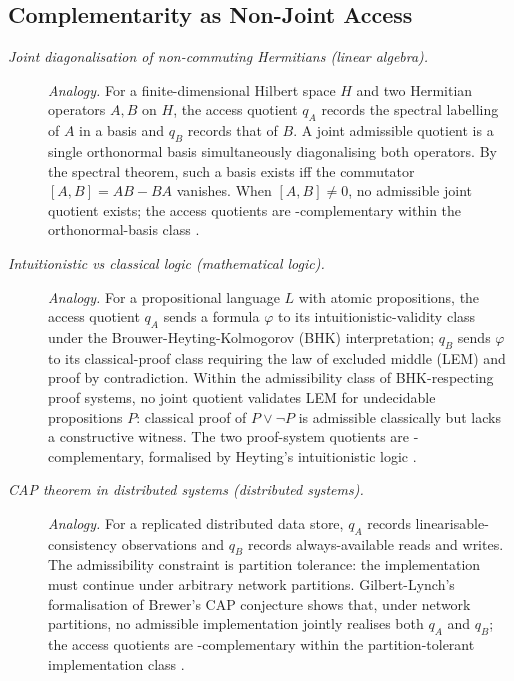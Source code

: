 \subsection*{ Complementarity as Non-Joint Access}
\begingroup\small
\begin{description}
\item[\emph{Joint diagonalisation of non-commuting
Hermitians (linear algebra).}] \textit{Analogy.}
For a finite-dimensional Hilbert space \(H\) and two
Hermitian operators \(A,B\) on \(H\), the access
quotient \(q_A\) records the spectral labelling of
\(A\) in a basis and \(q_B\) records that of \(B\).
A joint admissible quotient is a single orthonormal
basis simultaneously diagonalising both operators.
By the spectral theorem, such a basis exists iff the
commutator \([A,B]=AB-BA\) vanishes.  When
\([A,B]\ne 0\), no admissible joint quotient exists;
the access quotients are -complementary within
the orthonormal-basis class
\citep{Halmos1974FiniteDimensional}.

\item[\emph{Intuitionistic vs classical logic
(mathematical logic).}] \textit{Analogy.}
For a propositional language \(L\) with atomic
propositions, the access quotient \(q_A\) sends a
formula \(\varphi\) to its intuitionistic-validity
class under the Brouwer-Heyting-Kolmogorov (BHK)
interpretation; \(q_B\) sends \(\varphi\) to its
classical-proof class requiring the law of excluded
middle (LEM) and proof by contradiction.  Within the
admissibility class of BHK-respecting proof systems,
no joint quotient validates LEM for undecidable
propositions \(P\): classical proof of
\(P\vee\neg P\) is admissible classically but lacks
a constructive witness.  The two proof-system
quotients are -complementary, formalised by
Heyting's intuitionistic logic
\citep{Heyting1930Logik}.

\item[\emph{{CAP} theorem in distributed systems
(distributed systems).}] \textit{Analogy.}
For a replicated distributed data store, \(q_A\)
records linearisable-consistency observations and
\(q_B\) records always-available reads and writes.
The admissibility constraint is partition tolerance:
the implementation must continue under arbitrary
network partitions.  Gilbert-Lynch's formalisation of
Brewer's CAP conjecture shows that, under network
partitions, no admissible implementation jointly
realises both \(q_A\) and \(q_B\); the access
quotients are -complementary within the
partition-tolerant implementation class
\citep{GilbertLynch2002CAP}.


\end{description}
